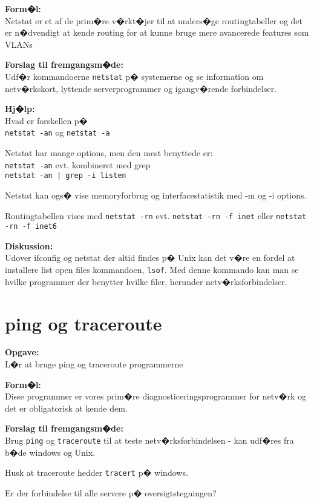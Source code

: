 \documentclass[a4paper,11pt,notitlepage]{oevelser}
\begin{document}
{\bfseries Form�l:}\\
Netstat er et af de prim�re v�rkt�jer til at unders�ge routingtabeller og det er n�dvendigt at kende routing for at kunne bruge mere avancerede features som VLANs

{\bfseries Forslag til fremgangsm�de:}\\
Udf�r kommandoerne \verb+netstat+ p� systemerne og
se information om netv�rkskort, lyttende serverprogrammer og
igangv�rende forbindelser.


{\bfseries Hj�lp:}\\
Hvad er forskellen p�\\
\verb+netstat -an+ og \verb+netstat -a+

Netstat har mange options, men den mest benyttede er:\\
\verb+netstat -an+ evt. kombineret med grep\\
\verb+netstat -an | grep -i listen+

Netstat kan ogs� vise memoryforbrug og interfacestatistik med -m og -i
options.

Routingtabellen vises med \verb+netstat -rn+ evt. \verb+netstat -rn -f inet+
eller \verb+netstat -rn -f inet6+


{\bfseries Diskussion:}\\
Udover ifconfig og netstat der altid findes p� Unix kan det v�re en
fordel at installere list open files kommandoen, \verb+lsof+. Med
denne kommando kan man se hvilke programmer der benytter hvilke filer,
herunder netv�rksforbindelser.

\chapter{ping og traceroute}
\label{ex:ping}

{\bfseries Opgave:}\\
L�r at bruge ping og traceroute programmerne

{\bfseries Form�l:}\\
Disse programmer er vores prim�re diagnosticeringsprogrammer for netv�rk og det er obligatorisk at kende dem.

{\bfseries Forslag til fremgangsm�de:} \\
Brug \verb+ping+ og \verb+traceroute+ til at teste netv�rksforbindelsen - kan
udf�res fra b�de windows og Unix.

Husk at traceroute hedder \verb+tracert+ p� windows.

Er der forbindelse til alle servere p� oversigtstegningen?
\end{document}
